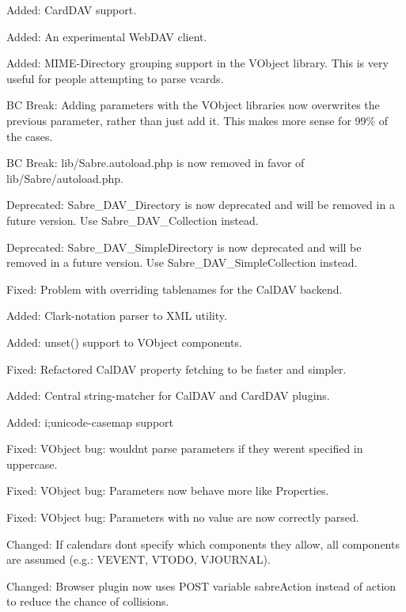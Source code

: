 \begin{DoxyItemize}
\item Added\+: Card\+D\+AV support.
\item Added\+: An experimental Web\+D\+AV client.
\item Added\+: M\+I\+M\+E-\/\+Directory grouping support in the V\+Object library. This is very useful for people attempting to parse vcards.
\item BC Break\+: Adding parameters with the V\+Object libraries now overwrites the previous parameter, rather than just add it. This makes more sense for 99\% of the cases.
\item BC Break\+: lib/\+Sabre.\+autoload.\+php is now removed in favor of lib/\+Sabre/autoload.\+php.
\item Deprecated\+: Sabre\+\_\+\+D\+A\+V\+\_\+\+Directory is now deprecated and will be removed in a future version. Use Sabre\+\_\+\+D\+A\+V\+\_\+\+Collection instead.
\item Deprecated\+: Sabre\+\_\+\+D\+A\+V\+\_\+\+Simple\+Directory is now deprecated and will be removed in a future version. Use Sabre\+\_\+\+D\+A\+V\+\_\+\+Simple\+Collection instead.
\item Fixed\+: Problem with overriding tablenames for the Cal\+D\+AV backend.
\item Added\+: Clark-\/notation parser to X\+ML utility.
\item Added\+: unset() support to V\+Object components.
\item Fixed\+: Refactored Cal\+D\+AV property fetching to be faster and simpler.
\item Added\+: Central string-\/matcher for Cal\+D\+AV and Card\+D\+AV plugins.
\item Added\+: i;unicode-\/casemap support
\item Fixed\+: V\+Object bug\+: wouldn\textquotesingle{}t parse parameters if they weren\textquotesingle{}t specified in uppercase.
\item Fixed\+: V\+Object bug\+: Parameters now behave more like Properties.
\item Fixed\+: V\+Object bug\+: Parameters with no value are now correctly parsed.
\item Changed\+: If calendars don\textquotesingle{}t specify which components they allow, \textquotesingle{}all\textquotesingle{} components are assumed (e.\+g.\+: V\+E\+V\+E\+NT, V\+T\+O\+DO, V\+J\+O\+U\+R\+N\+AL).
\item Changed\+: Browser plugin now uses P\+O\+ST variable \textquotesingle{}sabre\+Action\textquotesingle{} instead of \textquotesingle{}action\textquotesingle{} to reduce the chance of collisions.
\end{DoxyItemize}

